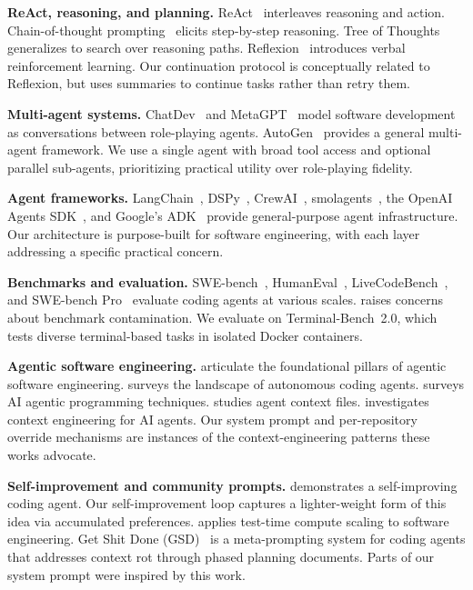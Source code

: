 \documentclass{article}
\begin{document}
\textbf{ReAct, reasoning, and planning.}  ReAct~\citep{yao2023react} interleaves reasoning and action.  Chain-of-thought prompting~\citep{wei2022chain} elicits step-by-step reasoning.  Tree of Thoughts~\citep{yao2023tree} generalizes to search over reasoning paths.  Reflexion~\citep{shinn2023reflexion} introduces verbal reinforcement learning.  Our continuation protocol is conceptually related to Reflexion, but uses summaries to continue tasks rather than retry them.

\textbf{Multi-agent systems.}  ChatDev~\citep{qian2024chatdev} and MetaGPT~\citep{hong2024metagpt} model software development as conversations between role-playing agents.  AutoGen~\citep{wu2023autogen} provides a general multi-agent framework.  We use a single agent with broad tool access and optional parallel sub-agents, prioritizing practical utility over role-playing fidelity.

\textbf{Agent frameworks.}  LangChain~\citep{langchain2022}, DSPy~\citep{khattab2024dspy}, CrewAI~\citep{crewai2024}, smolagents~\citep{smolagents2025}, the OpenAI Agents SDK~\citep{openaiagentssdk2025}, and Google's ADK~\citep{googleadk2025} provide general-purpose agent infrastructure.  Our architecture is purpose-built for software engineering, with each layer addressing a specific practical concern.

\textbf{Benchmarks and evaluation.}  SWE-bench~\citep{jimenez2024swebench}, HumanEval~\citep{chen2021evaluating}, LiveCodeBench~\citep{jain2024livecodebench}, and SWE-bench Pro~\citep{deng2025swebenchpro} evaluate coding agents at various scales.  \citet{prathifkumar2025swebenchverified} raises concerns about benchmark contamination.  We evaluate on Terminal-Bench~2.0, which tests diverse terminal-based tasks in isolated Docker containers.

\textbf{Agentic software engineering.}  \citet{hassan2025agentic} articulate the foundational pillars of agentic software engineering.  \citet{li2025rise} surveys the landscape of autonomous coding agents.  \citet{wang2025agentic} surveys AI agentic programming techniques.  \citet{chatlatanagulchai2025readmes} studies agent context files.  \citet{mohsenimofidi2025context} investigates context engineering for AI agents.  Our system prompt and per-repository override mechanisms are instances of the context-engineering patterns these works advocate.

\textbf{Self-improvement and community prompts.}  \citet{robeyns2025selfimproving} demonstrates a self-improving coding agent.  Our self-improvement loop captures a lighter-weight form of this idea via accumulated preferences.  \citet{gao2025trae} applies test-time compute scaling to software engineering.  Get Shit Done (GSD)~\citep{gsd2025} is a meta-prompting system for coding agents that addresses context rot through phased planning documents.  Parts of our system prompt were inspired by this work.
\end{document}
